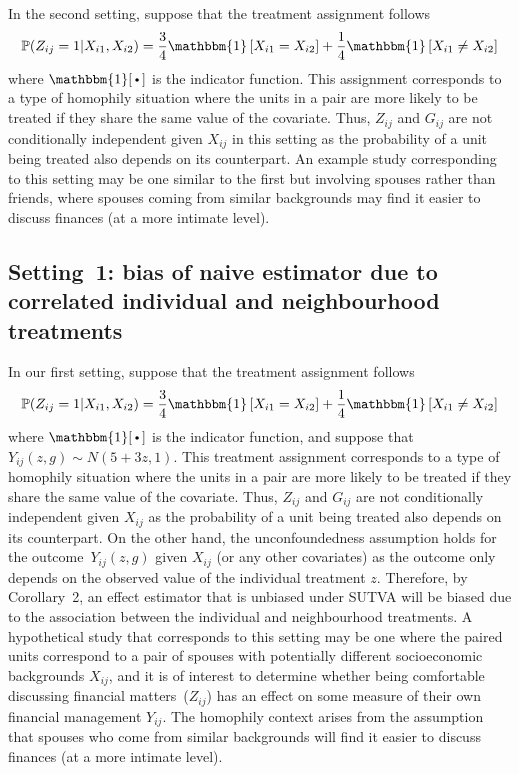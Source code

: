 \documentclass[10pt]{article}
\begin{document}
In the second setting, suppose that the treatment assignment follows
\[
\P(Z_{ij}=1|X_{i1},X_{i2}) = \frac{3}{4}\mathbbm{1}\left[X_{i1}=X_{i2}\right] + \frac{1}{4}\mathbbm{1}\left[X_{i1}\neq X_{i2}\right]
\]
where $\mathbbm{1}[\argdot]$ is the indicator function. This assignment corresponds to a type of homophily situation where the units in a pair are more likely to be treated if they share the same value of the covariate. Thus, $Z_{ij}$ and $G_{ij}$ are not conditionally independent given $X_{ij}$ in this setting as the probability of a unit being treated also depends on its counterpart. An example study corresponding to this setting may be one similar to the first but involving spouses rather than friends, where spouses coming from similar backgrounds may find it easier to discuss finances (at a more intimate level).
\fi

\subsection{Setting~1: bias of naive estimator due to correlated individual and neighbourhood treatments}

In our first setting, suppose that the treatment assignment follows
\[
\P(Z_{ij}=1|X_{i1},X_{i2}) = \frac{3}{4}\mathbbm{1}\left[X_{i1}=X_{i2}\right] + \frac{1}{4}\mathbbm{1}\left[X_{i1}\neq X_{i2}\right]
\]
where $\mathbbm{1}[\argdot]$ is the indicator function, and suppose that $Y_{ij}(z,g)\sim N(5+3z,1)$. This treatment assignment corresponds to a type of homophily situation where the units in a pair are more likely to be treated if they share the same value of the covariate. Thus, $Z_{ij}$ and $G_{ij}$ are not conditionally independent given $X_{ij}$ as the probability of a unit being treated also depends on its counterpart. On the other hand, the unconfoundedness assumption holds for the outcome~$Y_{ij}(z,g)$ given $X_{ij}$ (or any other covariates) as the outcome only depends on the observed value of the individual treatment $z$. Therefore, by Corollary~2, an effect estimator that is unbiased under SUTVA will be biased due to the association between the individual and neighbourhood treatments. A hypothetical study that corresponds to this setting may be one where the paired units correspond to a pair of spouses with potentially different socioeconomic backgrounds $X_{ij}$, and it is of interest to determine whether being comfortable discussing financial matters~($Z_{ij}$) has an effect on some measure of their own financial management $Y_{ij}$. The homophily context arises from the assumption that spouses who come from similar backgrounds will find it easier to discuss finances (at a more intimate level).
\\
\end{document}
